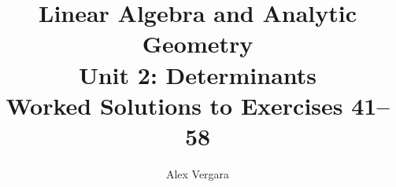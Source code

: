 \documentclass[12pt,twoside,a4paper]{article}
\title{
  \textbf{Linear Algebra and Analytic Geometry}\\[0.35em]
  \large Unit 2: Determinants\\[0.2em]
  \normalsize Worked Solutions to Exercises 41--58
}
\author{Alex Vergara}
\begin{document}
\maketitle

\begin{enumerate}


















\end{enumerate}
\end{document}
